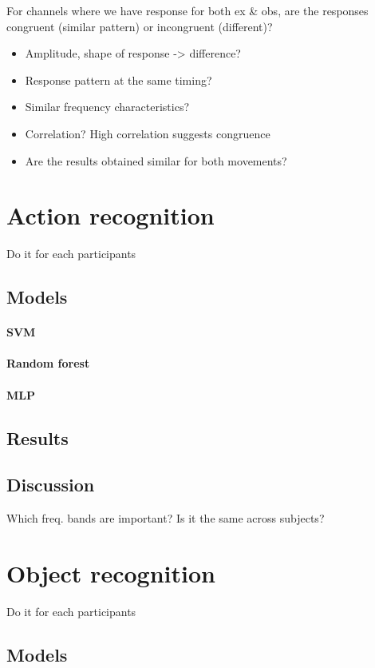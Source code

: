 \documentclass[10pt,conference,compsocconf]{IEEEtran}
\begin{document}
For channels where we have response for both ex \& obs, are the responses congruent (similar pattern) or incongruent (different)?

\begin{itemize}
    \item Amplitude, shape of response -> difference?
    \item Response pattern at the same timing?
    \item Similar frequency characteristics?
    \item Correlation? High correlation suggests congruence
    \item Are the results obtained similar for both movements?
\end{itemize}


\section{Action recognition}
\label{sec:actionrecognition}
Do it for each participants

\subsection{Models}
\paragraph{SVM}
\paragraph{Random forest}
\paragraph{MLP}
\subsection{Results}
\subsection{Discussion}
Which freq. bands are important? Is it the same across subjects?

\section{Object recognition}
\label{sec:objectrecognition}
Do it for each participants

\subsection{Models}
\end{document}

